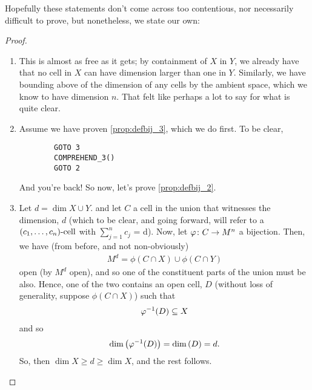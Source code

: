 Hopefully these statements don't come across too contentious, nor necessarily difficult to prove, but nonetheless, we state our own:
\begin{proof}
  \begin{enumerate}
    \item This is almost as free as it gets; by containment of $X$ in $Y$, we already have that no cell in $X$ can have dimension larger than one in $Y$. Similarly, we have bounding above of the dimension of any cells by the ambient space, which we know to have dimension $n$. That felt like perhaps a lot to say for what is quite clear.
    \item Assume we have proven \ref{prop:defbij_3}, which we do first. To be clear, 
      \begin{verbatim}
        GOTO 3
        COMPREHEND_3()
        GOTO 2
      \end{verbatim}
    And you're back! So now, let's prove \ref{prop:defbij_2}.
    \item Let $d = \dim{X \cup Y}$. and let $C$ a cell in the union that witnesses the dimension, $d$ (which to be clear, and going forward, will refer to a $(c_{1}, \hdots, c_{n})\textrm{-cell}$ with $\sum_{j=1}^{n} c_j$ = d). Now, let $\varphi \colon C \to M^n$ a  bijection. Then, we have (from before, and not non-obviously)
        \begin{align*}
          M^d = \phi(C \cap X) \cup \phi(C \cap Y)
        \end{align*}
        open (by $M^d$ open), and so one of the constituent parts of the union must be also. Hence, one of the two contains an open cell, $D$ (without loss of generality, suppose $\phi(C \cap X)$) such that 
        \begin{align*}
          \varphi^{-1}(D) \subseteq X
        \end{align*}
        and so
        \begin{align*}
          \operatorname{dim}\left(\varphi^{-1}(D)\right) = \operatorname{dim}\left(D\right) = d.
        \end{align*}
        So, then $\dim{X} \geq d \geq \dim{X}$, and the rest follows.
  \end{enumerate}
\end{proof}
